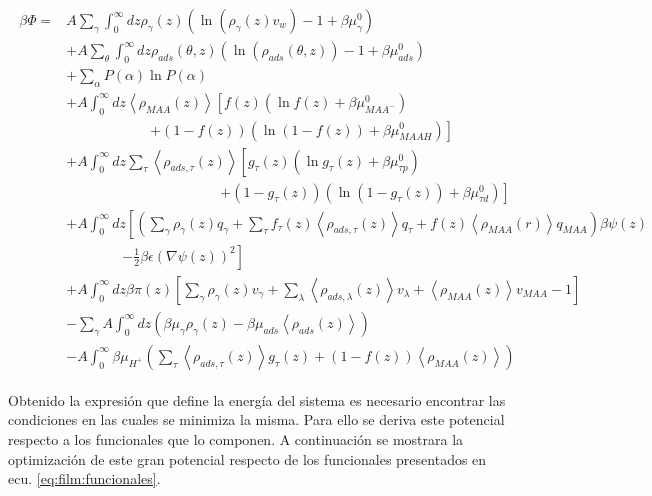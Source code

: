 \begin{align}
	\begin{aligned}
		\beta \Phi=  & A\sum_{\gamma}\int_0^\infty{dz\rho_\gamma(z)\left(\ln \left(\rho_\gamma (z)v_w\right) -1 + \beta\mu^0_\gamma\right)} \\
		&+ A\sum_{\theta}\int_0^\infty{dz\rho_{ads}(\theta,z)\left(\ln \left(\rho_{ads}(\theta,z)\right) -1 + \beta\mu^0_{ads} \right)} \\
		&+ \sum_\alpha{P(\alpha)\ln P(\alpha)} \\
		& + A\int_0^\infty dz \left<\rho_{MAA}(z)\right> \left[f(z)(\ln f(z)+ \beta\mu^0_{MAA^-})\right.\\
		& \qquad\qquad\qquad \left.+(1-f(z))(\ln (1-f(z))+\beta\mu^0_{MAAH})\right] \\
		& + A\int_0^\infty dz \sum_\tau \left<\rho_{ads,\tau}(z)\right> \left[g_\tau(z)(\ln g_\tau(z)+ \beta\mu^0_{\tau p})\right.\\
		&\qquad \qquad \qquad\qquad \qquad\quad \left.+(1-g_\tau(z))(\ln (1-g_\tau(z))+\beta\mu^0_{\tau d})\right]   \\
		& +A\int_0^\infty dz \left[\left(\sum_{\gamma } {\rho_\gamma(z) q_\gamma + \sum_\tau{f_\tau(z) \left<\rho_{ads,\tau}(z)\right> q_\tau} +  f(z) \left<\rho_{MAA}(r)\right>q_{MAA}}\right)\beta\psi(z) \right. \\ & \qquad \qquad \left.-\frac{1}{2}\beta\epsilon(\nabla\psi(z))^2 \right] \\ 
		& +A \int_0^\infty dz\beta\pi(z){\left[\sum_{\gamma}\rho_\gamma(z) v_\gamma + \sum_\lambda{\left<\rho_{ads,\lambda}(z)\right>v_\lambda} + \left<\rho_{MAA}(z)\right>v_{MAA} -1 \right]} \\
		&   -\sum_\gamma A\int_0^\infty dz \left(\beta \mu_\gamma \rho_\gamma(z) - \beta \mu_{ads} \left<\rho_{ads}(z)\right> \right)  \\
		&  -A\int_0^\infty \beta\mu_{H^+} \left( \sum_\tau\left< \rho_{ads,\tau}(z) \right>g_\tau(z) + (1-f(z)) \left< \rho_{MAA}(z) \right> \right )
	\end{aligned}
\end{align}
 
Obtenido la expresi\'on que define la energ\'ia del sistema es necesario encontrar las condiciones en las cuales se minimiza la misma. Para ello se deriva este potencial respecto a los funcionales que lo componen.
A continuaci\'on se mostrara la optimizaci\'on de este gran potencial respecto de los funcionales presentados en  ecu. \ref{eq:film:funcionales}.

